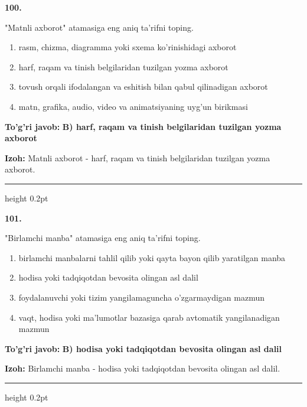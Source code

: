 \documentclass[10pt,a4paper,oneside]{article}
\begin{document}
\noindent\textbf{\color{ink}100.}
\par
"Matnli axborot" atamasiga eng aniq ta'rifni toping.
\begin{enumerate}[label=\Alph*),leftmargin=9mm]
\item rasm, chizma, diagramma yoki sxema ko'rinishidagi axborot
\item harf, raqam va tinish belgilaridan tuzilgan yozma axborot
\item tovush orqali ifodalangan va eshitish bilan qabul qilinadigan axborot
\item matn, grafika, audio, video va animatsiyaning uyg'un birikmasi
\end{enumerate}
\begin{tcolorbox}[enhanced,breakable,colback=teal!4,colframe=teal!50!black,boxrule=0.5pt,arc=1.1mm,left=3mm,right=3mm,top=1.7mm,bottom=1.7mm,before skip=2mm,after skip=2mm]
\textbf{\color{teal}To'g'ri javob:} \textbf{B) harf, raqam va tinish belgilaridan tuzilgan yozma axborot}
\par\smallskip
\textbf{Izoh:} Matnli axborot - harf, raqam va tinish belgilaridan tuzilgan yozma axborot.
\end{tcolorbox}
\vspace{2mm}\hrule height 0.2pt \vspace{3mm}

\noindent\textbf{\color{ink}101.}
\par
"Birlamchi manba" atamasiga eng aniq ta'rifni toping.
\begin{enumerate}[label=\Alph*),leftmargin=9mm]
\item birlamchi manbalarni tahlil qilib yoki qayta bayon qilib yaratilgan manba
\item hodisa yoki tadqiqotdan bevosita olingan asl dalil
\item foydalanuvchi yoki tizim yangilamaguncha o'zgarmaydigan mazmun
\item vaqt, hodisa yoki ma'lumotlar bazasiga qarab avtomatik yangilanadigan mazmun
\end{enumerate}
\begin{tcolorbox}[enhanced,breakable,colback=teal!4,colframe=teal!50!black,boxrule=0.5pt,arc=1.1mm,left=3mm,right=3mm,top=1.7mm,bottom=1.7mm,before skip=2mm,after skip=2mm]
\textbf{\color{teal}To'g'ri javob:} \textbf{B) hodisa yoki tadqiqotdan bevosita olingan asl dalil}
\par\smallskip
\textbf{Izoh:} Birlamchi manba - hodisa yoki tadqiqotdan bevosita olingan asl dalil.
\end{tcolorbox}
\vspace{2mm}\hrule height 0.2pt \vspace{3mm}
\end{document}

